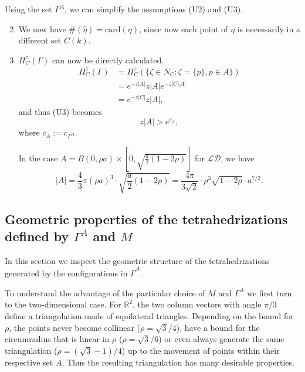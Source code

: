\begin{remark}\label{r:UA}
	Using the set $\Gamma^A$, we can simplify the assumptions (U2) and (U3).
\begin{enumerate}[(U1)]	
	\setcounter{enumi}{1}
	\item	We now have  $\#(\hat\eta) = \mathrm{card}(\eta)$, since now each point of $\eta$ is necessarily in a different set $C(k)$.

\item $\Pi^z_C(\Gamma)$ can now be directly calculated.
	\begin{align*} 
		\Pi^z_C(\Gamma) &= \Pi^z_C(\{\zeta \in N_C: \zeta = \{p\}, p \in A\}) \\
		& = e^{-z|A|} z |A| e^{-z|C\setminus A|} \\
		& = e^{-z|C|} z |A|,
	\end{align*}
	and thus (U3) becomes
	$$z|A| > e^{c_{A}},$$
	where $c_A := c_{\Gamma^A}$.

	In  the case $A = B(0,\rho a)\times [0, \sqrt{\frac a2(1-2\rho)}]$ for $\mathcal {LD}$, we have
	$$|A| = \frac 43 \pi (\rho a)^3 \cdot \sqrt{\frac a2(1-2\rho)} = \frac {4\pi}{3\sqrt{2}}\cdot  \rho^3 \sqrt{1-2\rho} \cdot a^{7/2}.$$

\end{enumerate}
\end{remark}

\subsection{Geometric properties of the tetrahedrizations defined by $\Gamma^A$ and $M$}
In this section we inspect the geometric structure of the tetrahedrizations generated by the configurations in $\bar \Gamma^A$.

To understand the advantage of the particular choice of $M$ and $\Gamma^A$ we first turn to the two-dimensional case. For $\mathbb R^2$, the two column vectors with angle $\pi/3$ define a triangulation made of equilateral triangles. Depending on the bound for $\rho$, the points never become collinear ($\rho = \sqrt 3/4$), have a bound for the circumradius that is linear in $\rho$ ($\rho = \sqrt 3/6$) or even always generate the same triangulation ($\rho = (\sqrt 3 - 1)/4$) up to the movement of points within their respective set $A$. Thus the resulting triangulation has many desirable properties. \newline

